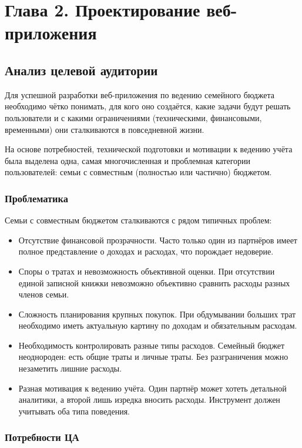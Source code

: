 \section*{Глава 2. Проектирование веб-приложения}


\subsection{Анализ целевой аудитории}

Для успешной разработки веб-приложения по ведению семейного бюджета необходимо чётко понимать, для кого оно создаётся, какие задачи будут решать пользователи и с какими ограничениями (техническими, финансовыми, временными) они сталкиваются в повседневной жизни.

На основе потребностей, технической подготовки и мотивации к ведению учёта была выделена одна, самая многочисленная и проблемная категории пользователей: семьи с совместным (полностью или частично) бюджетом.

\subsubsection{Проблематика}

Семьи с совместным бюджетом сталкиваются с рядом типичных проблем:
\begin{itemize}
    \item Отсутствие финансовой прозрачности. Часто только один из партнёров имеет полное представление о доходах и расходах, что порождает недоверие.
    \item Споры о тратах и невозможность объективной оценки. При отсутствии единой записной книжки невозможно объективно сравнить расходы разных членов семьи.
    \item Сложность планирования крупных покупок. При обдумывании больших трат необходимо иметь актуальную картину по доходам и обязательным расходам.
    \item Необходимость контролировать разные типы расходов. Семейный бюджет неоднороден: есть общие траты и личные траты. Без разграничения можно незаметить лишние расходы.
    \item Разная мотивация к ведению учёта. Один партнёр может хотеть детальной аналитики, а второй лишь изредка вносить расходы. Инструмент должен учитывать оба типа поведения.
\end{itemize}

\subsubsection{Потребности ЦА}

